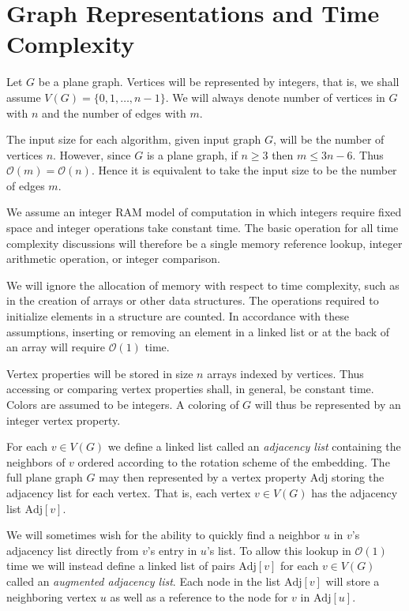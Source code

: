 \documentclass[letterpaper, 12pt]{article}
\theoremstyle{definition}
\theoremstyle{definition}
\theoremstyle{thm}
\theoremstyle{definition}
\begin{document}
\section{Graph Representations and Time Complexity}

Let $G$ be a plane graph. Vertices will be represented by integers, that is, we
shall assume $V(G)=\{0,1,\ldots,n-1\}$. We will always denote
number of vertices in $G$ with $n$ and the number of edges with $m$.

The input size for each algorithm, given input graph $G$, will be the
number of vertices $n$. However, since $G$ is a plane graph, if $n\ge 3$ then
$m\le 3n-6$. Thus $\mathcal{O}(m)= \mathcal{O}(n)$. Hence it is equivalent to
take the input size to be the number of edges $m$.

We assume an integer RAM model of computation in which integers require
fixed space and integer operations take constant time. The basic operation
for all time complexity discussions will therefore be a single memory reference
lookup, integer arithmetic operation, or integer comparison.

We will ignore the allocation of memory with respect to time complexity, such
as in the creation of arrays or other data structures. The operations
required to initialize elements in a structure are counted. In accordance
with these assumptions, inserting or removing an element in a linked list or at
the back of an array will require $\mathcal{O}(1)$ time.

Vertex properties will be stored in size $n$ arrays indexed by vertices. Thus accessing
or comparing vertex properties shall, in general, be constant time. Colors are assumed to be integers. A coloring of $G$ will thus be represented by
an integer vertex property.

For each $v\in V(G)$ we define a linked list called an
\emph{adjacency list} containing the neighbors of $v$ ordered according to
the rotation scheme of the embedding. The full plane graph $G$ may then
represented by a vertex property $\text{Adj}$ storing the adjacency list for
each vertex. That is, each vertex $v\in V(G)$ has the adjacency list $\text{Adj}[v]$.

We will sometimes wish for the ability to quickly find a neighbor $u$
in $v$'s adjacency list directly from $v$'s entry in $u$'s list. To allow this lookup in
$\mathcal{O}(1)$ time we will instead define a linked list of pairs $\text{Adj}[v]$ for
each $v\in V(G)$ called an \textit{augmented adjacency list}. Each node in the
list $\text{Adj}[v]$ will store a neighboring vertex $u$ as well as a reference
to the node for $v$ in $\text{Adj}[u]$.
\end{document}
